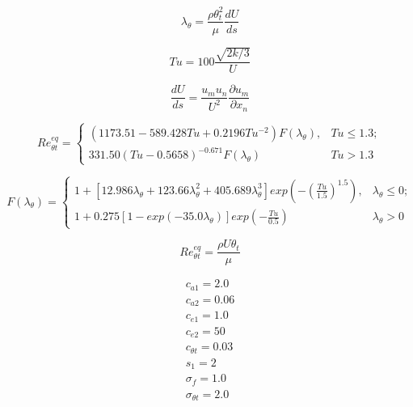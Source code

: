\documentclass[8pt]{article}
\begin{document}
\begin{equation}
    \lambda_{\theta} = \frac{\rho \theta_t ^2}{\mu} \frac{dU}{ds}
\end{equation}

\begin{equation}
    Tu = 100 \frac{\sqrt{2k/3}}{U}
\end{equation}

\begin{equation}
    \frac{dU}{ds} = \frac{u_m u_n}{U^2}  \frac{\partial u_m}{\partial x_n}
\end{equation}

\begin{equation}
   Re_{\theta t} ^{eq} = \left\{ 
      \begin{array}{ll}
         \left( 1173.51 - 589.428 Tu + 0.2196 Tu^{-2} \right) F \left( \lambda_{\theta} \right), & Tu \leq 1.3; \\
         331.50 \left(Tu - 0.5658 \right) ^{-0.671} F \left( \lambda_{\theta} \right) & Tu > 1.3
      \end{array} \right.
\end{equation}

\begin{equation}
  F \left( \lambda_{\theta} \right) = \left\{ 
      \begin{array}{ll}
         1 + \left[ 12.986 \lambda_{\theta} + 123.66 \lambda_{\theta} ^2 + 405.689 \lambda_{\theta} ^3 \right] exp \left( -\left( \frac{Tu}{1.5} \right)^{1.5} \right), & \lambda_{\theta} \leq 0; \\
         1 + 0.275 \left[1 - exp \left( -35.0 \lambda_{\theta} \right) \right] exp \left( - \frac{Tu}{0.5} \right) & \lambda_{\theta} > 0
      \end{array} \right.
\end{equation}

\begin{equation}
   Re_{\theta t} ^{eq} = \frac{\rho U \theta_t }{\mu}
\end{equation}

\begin{equation}
   \begin{array}{l}
      c_{a1} = 2.0 \\
      c_{a2} = 0.06 \\
      c_{e1} = 1.0 \\
      c_{e2} = 50 \\
      c_{\theta t} = 0.03 \\
      s_1 = 2 \\
      \sigma_{f} = 1.0 \\
      \sigma_{\theta t} = 2.0
   \end{array}
\end{equation}
\end{document}

